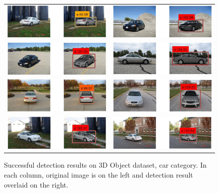 \documentclass[10pt,twocolumn,letterpaper]{article}
\begin{document}
\begin{figure}[h]
\setlength\tabcolsep{1pt}
\centering
\begin{tabular}{|c|c|}
  \hline
  \includegraphics[width=0.40\linewidth]{supp/car32.png} &
  \includegraphics[width=0.40\linewidth]{supp/car26.png} \\
  \includegraphics[width=0.40\linewidth]{supp/car29.png} & 
  \includegraphics[width=0.40\linewidth]{supp/car10.png} \\
  \includegraphics[width=0.40\linewidth]{supp/car1.png} &
  \includegraphics[width=0.40\linewidth]{supp/car8.png} \\
  \includegraphics[width=0.40\linewidth]{supp/car20.png} & 
  \includegraphics[width=0.40\linewidth]{supp/car31.png} \\
  \hline
  \end{tabular}
\caption{Successful detection results on 3D Object dataset, car
category. In each column, original image is on the left and detection result overlaid on
the right.}%
  \label{fig:3dobject_car_good}
\end{figure}
\end{document}
